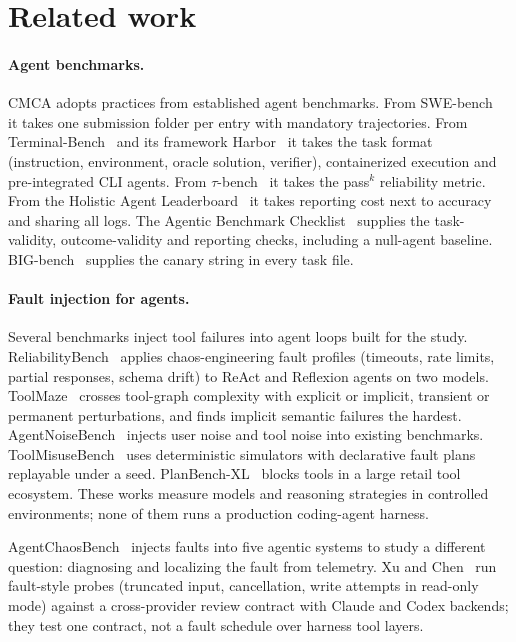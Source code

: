 \section{Related work}
\label{sec:related}

\paragraph{Agent benchmarks.}
CMCA adopts practices from established agent benchmarks.
From SWE-bench~\citep{jimenez2024swebench} it takes one submission folder per entry with mandatory trajectories.
From Terminal-Bench~\citep{merrill2026terminalbench} and its framework Harbor~\citep{harbor} it takes the task format (instruction, environment, oracle solution, verifier), containerized execution and pre-integrated CLI agents.
From $\tau$-bench~\citep{yao2024taubench} it takes the pass$^k$ reliability metric.
From the Holistic Agent Leaderboard~\citep{kapoor2025hal} it takes reporting cost next to accuracy and sharing all logs.
The Agentic Benchmark Checklist~\citep{zhu2025abc} supplies the task-validity, outcome-validity and reporting checks, including a null-agent baseline.
BIG-bench~\citep{srivastava2022bigbench} supplies the canary string in every task file.

\paragraph{Fault injection for agents.}
Several benchmarks inject tool failures into agent loops built for the study.
ReliabilityBench~\citep{gupta2026reliabilitybench} applies chaos-engineering fault profiles (timeouts, rate limits, partial responses, schema drift) to ReAct and Reflexion agents on two models.
ToolMaze~\citep{zhu2026toolmaze} crosses tool-graph complexity with explicit or implicit, transient or permanent perturbations, and finds implicit semantic failures the hardest.
AgentNoiseBench~\citep{wang2026agentnoisebench} injects user noise and tool noise into existing benchmarks.
ToolMisuseBench~\citep{sigdel2026toolmisusebench} uses deterministic simulators with declarative fault plans replayable under a seed.
PlanBench-XL~\citep{liu2026planbenchxl} blocks tools in a large retail tool ecosystem.
These works measure models and reasoning strategies in controlled environments; none of them runs a production coding-agent harness.

AgentChaosBench~\citep{zhang2026agentchaosbench} injects faults into five agentic systems to study a different question: diagnosing and localizing the fault from telemetry.
Xu and Chen~\citep{xu2026crossprovider} run fault-style probes (truncated input, cancellation, write attempts in read-only mode) against a cross-provider review contract with Claude and Codex backends; they test one contract, not a fault schedule over harness tool layers.

